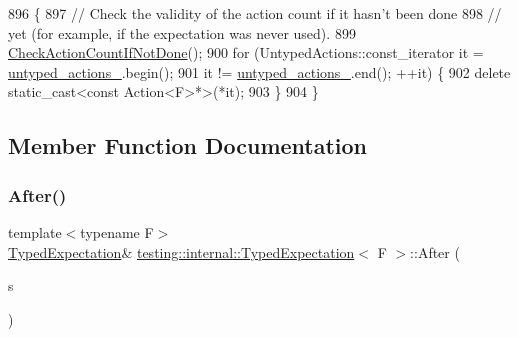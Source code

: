 \begin{DoxyCode}
896                               \{
897     \textcolor{comment}{// Check the validity of the action count if it hasn't been done}
898     \textcolor{comment}{// yet (for example, if the expectation was never used).}
899     \hyperlink{classtesting_1_1internal_1_1ExpectationBase_aaeb143b6f8676e9a6fb9b17678344f03}{CheckActionCountIfNotDone}();
900     \textcolor{keywordflow}{for} (UntypedActions::const\_iterator it = \hyperlink{classtesting_1_1internal_1_1ExpectationBase_a9558ff6b8b1b7e3a99fac1f93d1826da}{untyped\_actions\_}.begin();
901          it != \hyperlink{classtesting_1_1internal_1_1ExpectationBase_a9558ff6b8b1b7e3a99fac1f93d1826da}{untyped\_actions\_}.end(); ++it) \{
902       \textcolor{keyword}{delete} \textcolor{keyword}{static\_cast<}\textcolor{keyword}{const }Action<F>*\textcolor{keyword}{>}(*it);
903     \}
904   \}
\end{DoxyCode}


\subsection{Member Function Documentation}
\mbox{\label{classtesting_1_1internal_1_1TypedExpectation_a30f320d18ebf1a40e94883d7a56c6c8c}} 
\subsubsection{\texorpdfstring{After()}{After()}\hspace{0.1cm}{\footnotesize\ttfamily [1/5]}}
{\footnotesize\ttfamily template$<$typename F$>$ \\
\hyperlink{classtesting_1_1internal_1_1TypedExpectation}{Typed\+Expectation}\& \hyperlink{classtesting_1_1internal_1_1TypedExpectation}{testing\+::internal\+::\+Typed\+Expectation}$<$ F $>$\+::After (\begin{DoxyParamCaption}\item[{const \hyperlink{classtesting_1_1ExpectationSet}{Expectation\+Set} \&}]{s }\end{DoxyParamCaption})\hspace{0.3cm}{\ttfamily [inline]}}



